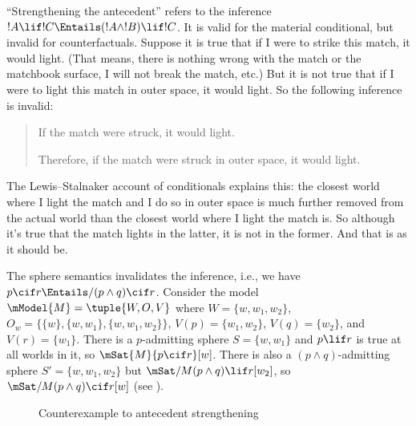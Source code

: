 \documentclass[../../../include/open-logic-section]{subfiles}
\begin{document}


``Strengthening the antecedent'' refers to the
inference $!A \lif !C \Entails (!A \land !B) \lif !C$.  It is valid
for the material conditional, but invalid for counterfactuals. Suppose
it is true that if I were to strike this match, it would light. (That
means, there is nothing wrong with the match or the matchbook surface,
I will not break the match, etc.) But it is not true that if I were to
light this match in outer space, it would light. So the following
inference is invalid:
\begin{quote}
  If the match were struck, it would light.

  Therefore, if the match were struck in outer space, it would light.
\end{quote}

The Lewis--Stalnaker account of conditionals explains this: the closest
world where I light the match and I do so in outer space is much
further removed from the actual world than the closest world where I
light the match is. So although it's true that the match lights in the
latter, it is not in the former. And that is as it should be.

\begin{ex}
  The sphere semantics invalidates the inference, i.e., we have $p
  \cif r \Entails/ (p \land q) \cif r$. Consider the model $\mModel{M}
  = \tuple{W, O, V}$ where $W = \{w, w_1, w_2\}$, $O_w = \{\{w\}, \{w,
  w_1\}, \{w, w_1, w_2\}\}$, $V(p) = \{w_1, w_2\}$, $V(q) = \{w_2\}$,
  and $V(r) = \{w_1\}$. There is a $p$-admitting sphere $S = \{w,
  w_1\}$ and $p \lif r$ is true at all worlds in it, so $\mSat{M}{p
    \cif r}[w]$. There is also a $(p \land q)$-admitting sphere $S' =
  \{w, w_1, w_2\}$ but $\mSat/{M}{(p \land q) \lif r}[w_2]$, so
  $\mSat/{M}{(p \land q) \cif r}[w]$ (see ).

\begin{figure}
\begin{center}
\caption{Counterexample to antecedent strengthening}
\end{center}
\end{figure}
\end{ex}
\end{document}

